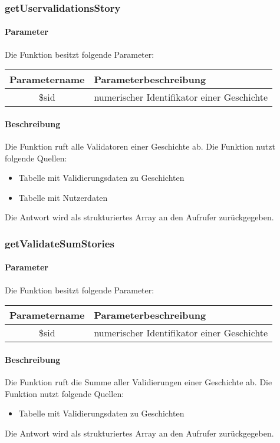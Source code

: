 \subsubsection{getUservalidationsStory}
\paragraph{Parameter} Die Funktion besitzt folgende Parameter:
\begin{table}[H]
	\begin{tabular}{|c|p{11cm}|}
		\hline
		\textbf{Parametername} & \textbf{Parameterbeschreibung} \\ \hline
		\$sid & numerischer Identifikator einer Geschichte \\ \hline
	\end{tabular}
\end{table}
\paragraph{Beschreibung} Die Funktion ruft alle Validatoren einer Geschichte ab. Die Funktion nutzt folgende Quellen:
\begin{itemize}
	\item Tabelle mit Validierungsdaten zu Geschichten
	\item Tabelle mit Nutzerdaten
\end{itemize}
Die Antwort wird als strukturiertes Array an den Aufrufer zurückgegeben.
\subsubsection{getValidateSumStories}
\paragraph{Parameter} Die Funktion besitzt folgende Parameter:
\begin{table}[H]
	\begin{tabular}{|c|p{11cm}|}
		\hline
		\textbf{Parametername} & \textbf{Parameterbeschreibung} \\ \hline
		\$sid & numerischer Identifikator einer Geschichte \\ \hline
	\end{tabular}
\end{table}
\paragraph{Beschreibung} Die Funktion ruft die Summe aller Validierungen einer Geschichte ab. Die Funktion nutzt folgende Quellen:
\begin{itemize}
	\item Tabelle mit Validierungsdaten zu Geschichten
\end{itemize}
Die Antwort wird als strukturiertes Array an den Aufrufer zurückgegeben.
